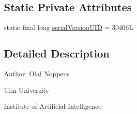 \subsection*{Static Private Attributes}
\begin{DoxyCompactItemize}
\item 
static final long \hyperlink{classde_1_1uulm_1_1ecs_1_1ai_1_1owlapi_1_1krssparser_1_1_k_r_s_s2_ontology_format_a1092bdb2448f8cf027d5b129e0bfd059}{serial\-Version\-U\-I\-D} = 30406\-L
\end{DoxyCompactItemize}


\subsection{Detailed Description}
Author\-: Olaf Noppens\par
 Ulm University\par
 Institute of Artificial Intelligence\par
 


